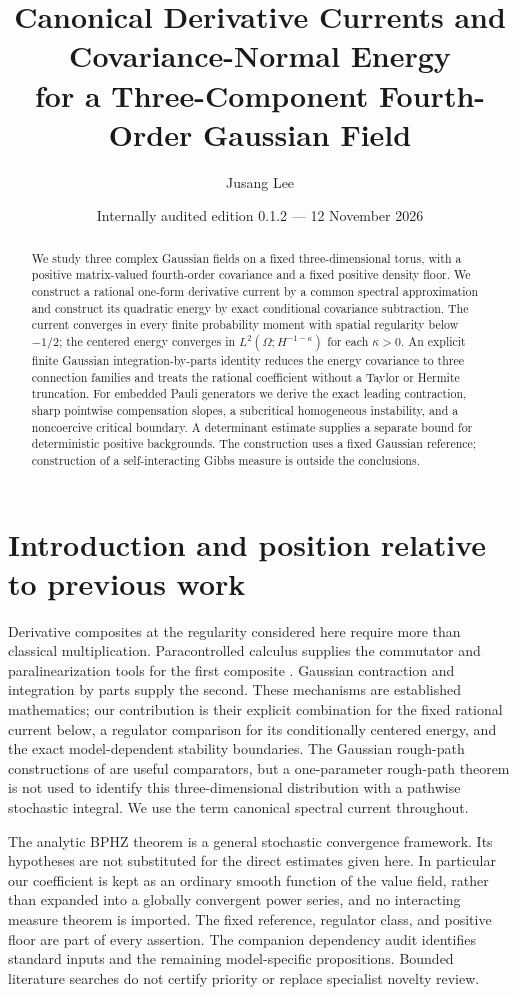 \documentclass[11pt]{article}
\title{Canonical Derivative Currents and Covariance-Normal Energy\protect\\for a Three-Component Fourth-Order Gaussian Field}
\author{Jusang Lee}
\date{Internally audited edition 0.1.2 --- 12 November 2026}
\begin{document}
\maketitle
\begin{abstract}
We study three complex Gaussian fields on a fixed three-dimensional torus,
with a positive matrix-valued fourth-order covariance and a fixed positive
density floor. We construct a rational one-form derivative current by a
common spectral approximation and construct its quadratic energy by exact
conditional covariance subtraction. The current converges in every finite
probability moment with spatial regularity below $-1/2$; the centered energy
converges in $L^2(\Omega;H^{-1-\kappa})$ for each $\kappa>0$.
An explicit finite Gaussian integration-by-parts identity reduces the energy
covariance to three connection families and treats the rational coefficient
without a Taylor or Hermite truncation. For embedded Pauli generators we
derive the exact leading contraction, sharp pointwise compensation slopes,
a subcritical homogeneous instability, and a noncoercive critical boundary.
A determinant estimate supplies a separate bound for deterministic positive
backgrounds. The construction uses a fixed Gaussian reference; construction
of a self-interacting Gibbs measure is outside the conclusions.
\end{abstract}

\section{Introduction and position relative to previous work}
Derivative composites at the regularity considered here require more than
classical multiplication. Paracontrolled calculus supplies the commutator
and paralinearization tools for the first composite \cite{GIP}. Gaussian
contraction and integration by parts supply the second. These mechanisms
are established mathematics; our contribution is their explicit combination
for the fixed rational current below, a regulator comparison for its
conditionally centered energy, and the exact model-dependent stability
boundaries. The Gaussian rough-path constructions of \cite{FV} are useful
comparators, but a one-parameter rough-path theorem is not used to identify
this three-dimensional distribution with a pathwise stochastic integral.
We use the term canonical spectral current throughout.

The analytic BPHZ theorem \cite{CH} is a general stochastic convergence
framework. Its hypotheses are not substituted for the direct estimates
given here. In particular our coefficient is kept as an ordinary smooth
function of the value field, rather than expanded into a globally convergent
power series, and no interacting measure theorem is imported. The fixed
reference, regulator class, and positive floor are part of every assertion.
The companion dependency audit identifies standard inputs and the remaining
model-specific propositions. Bounded literature searches do not certify
priority or replace specialist novelty review.
\end{document}
